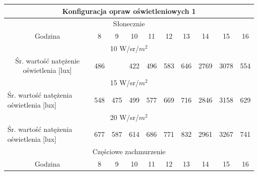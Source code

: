 \documentclass[a4paper,12pt]{article}
\begin{document}
	\begin{table}[!ht]
		\begin{tabular}{|c|c|c|c|c|c|c|c|c|c|}
			\hline
			
			\multicolumn{10}{|c|}{\cellcolor[HTML]{C8DFC8}Konfiguracja opraw oświetleniowych 1} \\ \hline
			
			\multicolumn{10}{|c|}{\cellcolor[HTML]{EDD9A0}Słonecznie} \\ \hline
			Godzina & \cellcolor[HTML]{FFFFFF}8 & \cellcolor[HTML]{FFFFFF}9 & \cellcolor[HTML]{FFFFFF}10 & \cellcolor[HTML]{FFFFFF}11 & \cellcolor[HTML]{FFFFFF}12 & \cellcolor[HTML]{FFFFFF}13 & \cellcolor[HTML]{FFFFFF}14 & \cellcolor[HTML]{FFFFFF}15 & \cellcolor[HTML]{FFFFFF}16 \\ \hline
			
			\multicolumn{10}{|c|}{10 W/sr/$m^{2}$} \\ \hline
			Śr. wartość natężenie oświetlenia {[}lux{]} & \cellcolor[HTML]{F6E9C3}486 & \cellcolor[HTML]{FFCCC9}{\color[HTML]{000000} 398} & \cellcolor[HTML]{F6E9C3}422 & \cellcolor[HTML]{F6E9C3}496 & \cellcolor[HTML]{F6E9C3}583 & \cellcolor[HTML]{F6E9C3}646 & \cellcolor[HTML]{F6E9C3}2769 & \cellcolor[HTML]						{F6E9C3}3078 & \cellcolor[HTML]{F6E9C3}554 \\ \hline
			
			\multicolumn{10}{|c|}{15 W/sr/$m^{2}$} \\ \hline
			
			\multicolumn{1}{|l|}{Śr. wartość natężenia oświetlenia {[}lux{]}} & \cellcolor[HTML]{F6E9C3}548 & \cellcolor[HTML]{F6E9C3}475 & \cellcolor[HTML]{F6E9C3}499 & \cellcolor[HTML]{F6E9C3}577 & \cellcolor[HTML]{F6E9C3}669 & \cellcolor[HTML]{F6E9C3}716 & \cellcolor[HTML]{F6E9C3}2846 & \cellcolor[HTML]{F6E9C3}					3158 & \cellcolor[HTML]{F6E9C3}629 \\ \hline
			
			\multicolumn{10}{|c|}{20 W/sr/$m^{2}$} \\ \hline
			
			\multicolumn{1}{|l|}{Śr. wartość natężenia oświetlenia {[}lux{]}} & \cellcolor[HTML]{F6E9C3}677 & \cellcolor[HTML]{F6E9C3}587 & \cellcolor[HTML]{F6E9C3}614 & \cellcolor[HTML]{F6E9C3}686 & \cellcolor[HTML]{F6E9C3}771 & \cellcolor[HTML]{F6E9C3}832 & \cellcolor[HTML]{F6E9C3}2961 & \cellcolor[HTML]{F6E9C3}					3267 & \cellcolor[HTML]{F6E9C3}741 \\ \hline
			
			\multicolumn{10}{|c|}{\cellcolor[HTML]{B2BFE5}Częściowe zachmurzenie} \\ \hline
			Godzina & \cellcolor[HTML]{FFFFFF}8 & \cellcolor[HTML]{FFFFFF}9 & \cellcolor[HTML]{FFFFFF}10 & \cellcolor[HTML]{FFFFFF}11 & \cellcolor[HTML]{FFFFFF}12 & \cellcolor[HTML]{FFFFFF}13 & \cellcolor[HTML]{FFFFFF}14 & \cellcolor[HTML]{FFFFFF}15 & \cellcolor[HTML]{FFFFFF}16 \\ \hline
			

\end{tabular}
\end{table}
\end{document}
